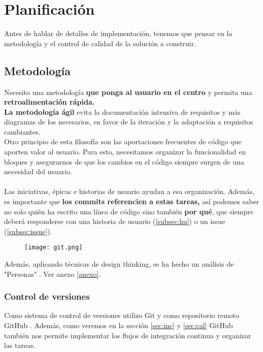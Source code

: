 \chapter{Planificación}

Antes de hablar de detalles de implementación, tenemos que pensar en la metodología y el control de calidad de la solución a construir.

\section{Metodología}

Necesito una metodología \textbf{que ponga al usuario en el centro} y permita una \textbf{retroalimentación rápida.} \\
\textbf{La metodología ágil} evita la documentación intensiva de requisitos y más diagramas de los necesarios, en favor de la iteración y la adaptación a requisitos cambiantes.\\

Otro principio de esta filosofía son las aportaciones frecuentes de código que aporten valor al usuario. Para esto,
necesitamos organizar la funcionalidad en bloques y asegurarnos de que los cambios en el código siempre surgen
de una necesidad del usuario. \\ \\
Las iniciativas, épicas e historias de usuario ayudan a esa organización.
Además, es importante que \textbf{los commits referencien a estas tareas,} así podemos
saber no solo quién ha escrito una línea de código sino también \textbf{por qué}, que siempre deberá responderse con una historia de usuario (\ref{subsec:hu}) o un issue (\ref{subsec:issue}).

\begin{figure}[H]
\centering	
\texttt{[image: git.png]}
\end{figure}

Además, aplicando técnicas de design thinking, se ha hecho un análisis de "Personas" \cite{personas}. Ver anexo \ref{anexo}.

\subsection{Control de versiones}
Como sistema de control de versiones utilizo Git y como repositorio remoto GitHub \cite{repo}. Además, como veremos en la sección \ref{sec:inc} y \ref{sec:cal} GitHub
también nos permite implementar los flujos de integración continua y organizar las tareas.

